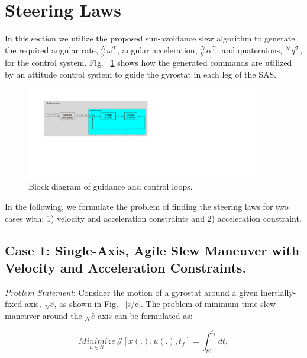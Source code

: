 \documentclass[letterpaper, paper,12pt]{AAS}		%
\begin{document}
	
	\section{Steering Laws} 
	In this section we utilize the proposed sun-avoidance slew algorithm to generate the required angular rate, $_\mathcal{G}^\mathcal{N}\omega^\mathcal{T}$, angular acceleration, $_\mathcal{G}^\mathcal{N}\alpha^\mathcal{T}$, and quaternions, $^\mathcal{N}q^\mathcal{T}$, for the control system. Fig. ~\ref{guidance_loop} shows how the generated commands are utilized by an attitude control system to guide the gyrostat in each leg of the SAS.
		\begin{figure}[H]
		\begin{center}
			\includegraphics[width=4in]{./Figures/guidance_loop}  
			\caption{Block diagram of guidance and control loops. }
			\label{guidance_loop}
		\end{center}    
	\end{figure}
	
	In the following, we formulate the problem of finding the steering laws for two cases with: 1) velocity and acceleration constraints and 2) acceleration constraint.
	\subsection{Case 1: Single-Axis, Agile Slew Maneuver with Velocity and Acceleration Constraints.}	 
	

	{\it Problem Statement}: Consider the motion of a gyrostat around a given inertially-fixed axis, $_\mathcal{N}\hat{e}$, as shown in Fig. ~\ref{s/c}. The problem of minimum-time slew maneuver around the $_\mathcal{N}\hat{e}$-axis can be formulated as:
	
	\begin{equation}\label{costfunction}
	\underset{u\in \mathcal{U}}{Minimize}\ \mathcal{J}[x(.), u(.), t_f]=\int_{t0}^{t_f} dt,
	\end{equation}
	
\end{document}
